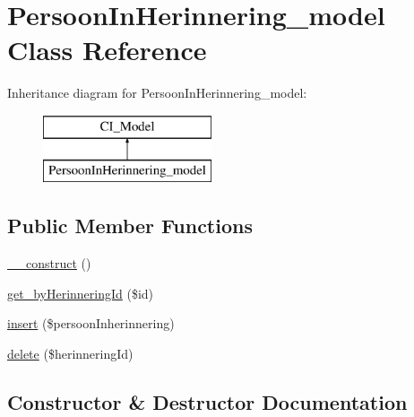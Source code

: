 \hypertarget{class_persoon_in_herinnering__model}{}\section{Persoon\+In\+Herinnering\+\_\+model Class Reference}
\label{class_persoon_in_herinnering__model}
Inheritance diagram for Persoon\+In\+Herinnering\+\_\+model\+:\begin{figure}[H]
\begin{center}
\leavevmode
\includegraphics[height=2.000000cm]{class_persoon_in_herinnering__model}
\end{center}
\end{figure}
\subsection*{Public Member Functions}
\begin{DoxyCompactItemize}
\item 
\mbox{\hyperlink{class_persoon_in_herinnering__model_a9dd863caf95bb6dda565526e3892c2b5}{\+\_\+\+\_\+construct}} ()
\item 
\mbox{\hyperlink{class_persoon_in_herinnering__model_aae7c684767759ee244cf1e190a516952}{get\+\_\+by\+Herinnering\+Id}} (\$id)
\item 
\mbox{\hyperlink{class_persoon_in_herinnering__model_ab19b43169595548f27dd52a93a81ab9b}{insert}} (\$persoon\+Inherinnering)
\item 
\mbox{\hyperlink{class_persoon_in_herinnering__model_acdf0cb89162001b81f64a36eb8bd7663}{delete}} (\$herinnering\+Id)
\end{DoxyCompactItemize}


\subsection{Constructor \& Destructor Documentation}
\mbox{\label{class_persoon_in_herinnering__model_a9dd863caf95bb6dda565526e3892c2b5}} 
